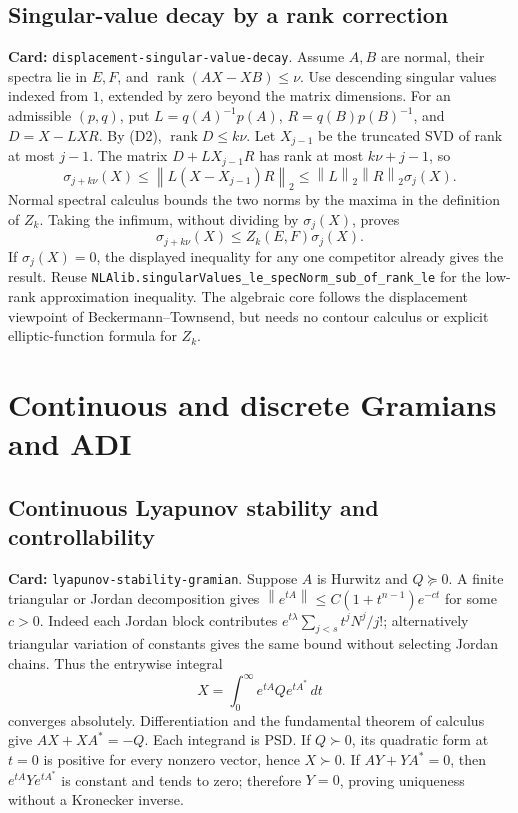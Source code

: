 \documentclass[11pt,a4paper]{article}
\newcommand{\norm}[1]{\left\lVert#1\right\rVert}
\DeclareMathOperator{\rank}{rank}
\DeclareRobustCommand{\code}[1]{{\footnotesize\urlstyle{tt}\nolinkurl{#1}}}
\begin{document}
\subsection{Singular-value decay by a rank correction}
\label{route:displacement-singular-value-decay}
\textbf{Card:} \code{displacement-singular-value-decay}.
Assume $A,B$ are normal, their spectra lie in $E,F$, and
$\rank(AX-XB)\le\nu$. Use descending singular values indexed from $1$,
extended by zero beyond the matrix dimensions. For an admissible $(p,q)$,
put $L=q(A)^{-1}p(A)$, $R=q(B)p(B)^{-1}$, and $D=X-LXR$.
By (D2), $\rank D\le k\nu$. Let $X_{j-1}$ be the truncated SVD of rank
at most $j-1$. The matrix $D+LX_{j-1}R$ has rank at most $k\nu+j-1$, so
\[
 \sigma_{j+k\nu}(X)
 \le\norm{L(X-X_{j-1})R}_2
 \le\norm L_2\norm R_2\sigma_j(X).
\]
Normal spectral calculus bounds the two norms by the maxima in the
definition of $Z_k$. Taking the infimum, without dividing by
$\sigma_j(X)$, proves
\[
 \boxed{\sigma_{j+k\nu}(X)\le Z_k(E,F)\sigma_j(X).}
\]
If $\sigma_j(X)=0$, the displayed inequality for any one competitor already
gives the result. Reuse
\code{NLAlib.singularValues_le_specNorm_sub_of_rank_le} for the low-rank
approximation inequality. The algebraic core follows the displacement
viewpoint of Beckermann--Townsend, but needs no contour calculus or explicit
elliptic-function formula for $Z_k$.

\section{Continuous and discrete Gramians and ADI}
\subsection{Continuous Lyapunov stability and controllability}
\label{route:lyapunov-stability-gramian}
\textbf{Card:} \code{lyapunov-stability-gramian}.
Suppose $A$ is Hurwitz and $Q\succeq0$. A finite triangular or Jordan
decomposition gives $\norm{e^{tA}}\le C(1+t^{n-1})e^{-ct}$ for some
$c>0$. Indeed each Jordan block contributes
$e^{t\lambda}\sum_{j<s}t^jN^j/j!$; alternatively triangular variation of
constants gives the same bound without selecting Jordan chains.
Thus the entrywise integral
\[
 X=\int_0^\infty e^{tA}Qe^{tA^*}\,dt \tag{G1}
\]
converges absolutely. Differentiation and the fundamental theorem of
calculus give $AX+XA^*=-Q$. Each integrand is PSD. If $Q\succ0$, its
quadratic form at $t=0$ is positive for every nonzero vector, hence $X\succ0$.
If $AY+YA^*=0$, then $e^{tA}Ye^{tA^*}$ is constant and tends to zero;
therefore $Y=0$, proving uniqueness without a Kronecker inverse.
\end{document}
